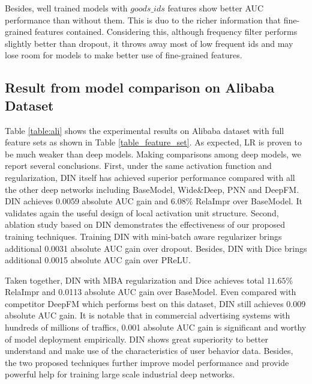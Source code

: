 Besides, well trained models with $goods\_ids$ features show better AUC performance than without them. This is duo to the richer information that fine-grained features contained.
Considering this, although frequency filter performs slightly better than dropout, it throws away most of low frequent ids and may lose room for models to make better use of fine-grained features. 


\subsection{Result from model comparison on Alibaba Dataset}
Table \ref{table:ali} shows the experimental results on Alibaba dataset with full feature sets as shown in Table \ref{table_feature_set}.
As expected, LR is proven to be much weaker than deep models. 
Making comparisons among deep models, we report several conclusions.  
First, under the same activation function and regularization, DIN itself has achieved superior performance compared with all the other deep networks including BaseModel, Wide\&Deep, PNN and DeepFM. DIN achieves 0.0059 absolute AUC gain and $6.08\%$ RelaImpr over BaseModel. It validates again the useful design of local activation unit structure.   
Second, ablation study based on DIN demonstrates the effectiveness of our proposed training techniques. Training DIN with mini-batch aware regularizer brings additional 0.0031 absolute AUC gain over dropout. Besides, DIN with Dice brings additional 0.0015 absolute AUC gain over PReLU. 

Taken together, DIN with MBA regularization and Dice achieves total $11.65\%$ RelaImpr and 0.0113 absolute AUC gain over BaseModel. Even compared with competitor DeepFM which performs best on this dataset, DIN still achieves 0.009  absolute AUC gain. 
It is notable that in commercial advertising systems with hundreds of millions of traffics, 0.001 absolute AUC gain is significant and worthy of model deployment empirically. 
DIN shows great superiority to better understand and make use of the characteristics of user behavior data. 
Besides, the two proposed techniques further improve model performance and provide powerful help for training large scale industrial deep networks.   

